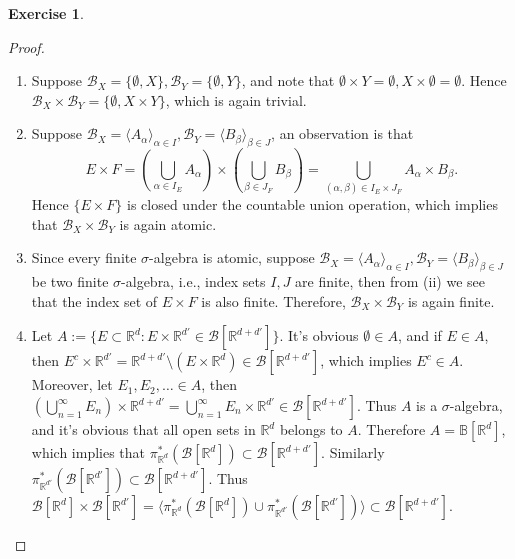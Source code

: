 \documentclass[a4paper]{article}
\newtheorem{ex}{Exercise}[subsection]
\begin{document}
\begin{ex}\end{ex}\begin{proof}\ \begin{enumerate}[label = (\roman*)]
    \item Suppose $\mathcal{B}_X = \{\emptyset, X\}, \mathcal{B}_Y = \{\emptyset, Y\}$, and note that $\emptyset \times Y = \emptyset,
    X \times \emptyset = \emptyset$. Hence $\mathcal{B}_X \times \mathcal{B}_Y = \{\emptyset, X \times Y\}$, which
    is again trivial.
    \item Suppose $\mathcal{B}_X = \langle A_\alpha \rangle_{\alpha \in I}, \mathcal{B}_Y = \langle B_\beta \rangle_{\beta \in J}$, 
    an observation is that $$
    E \times F = (\bigcup_{\alpha \in I_E} A_\alpha) \times (\bigcup_{\beta \in J_F} B_\beta) = \bigcup_{(\alpha, \beta) \in I_E \times J_F}
    A_\alpha \times B_\beta.
    $$Hence $\{E \times F\}$ is closed under the countable union operation, which implies that $\mathcal{B}_X \times \mathcal{B}_Y$
    is again atomic.
    \item Since every finite $\sigma$-algebra is atomic, suppose 
    $\mathcal{B}_X = \langle A_\alpha \rangle_{\alpha \in I}, \mathcal{B}_Y = \langle B_\beta \rangle_{\beta \in J}$ be 
    two finite $\sigma$-algebra, i.e., index sets $I, J$ are finite, then from (ii) we see that the index set of $E \times F$
    is also finite. Therefore, $\mathcal{B}_X \times \mathcal{B}_Y$ is again finite.
    \item Let $A := \{E \subset \mathbb{R}^d : E \times \mathbb{R}^{d'} \in \mathcal{B}[\mathbb{R}^{d + d'}]\}$. 
    It's obvious $\emptyset \in A$, and if $E \in A$, then $E^c \times \mathbb{R}^{d'} = \mathbb{R}^{d + d'} \setminus (E \times \mathbb{R}^d) 
    \in \mathcal{B}[\mathbb{R}^{d + d'}]$, which implies $E^c \in A$. Moreover, let $E_1, E_2, \dots \in A$, then 
    $(\bigcup_{n = 1}^\infty E_n) \times \mathbb{R}^{d + d'} = \bigcup_{n = 1}^\infty E_n \times \mathbb{R}^{d'} \in \mathcal{B}[\mathbb{R}^{d + d'}]$.
    Thus $A$ is a $\sigma$-algebra, and it's obvious that all open sets in $\mathbb{R}^d$ belongs to $A$. Therefore 
    $A = \mathbb{B}[\mathbb{R}^d]$, which implies that $\pi^*_{\mathbb{R}^d}(\mathcal{B}[\mathbb{R}^d]) \subset \mathcal{B}[\mathbb{R}^{d + d'}]$.
    Similarly $\pi^*_{\mathbb{R}^{d'}}(\mathcal{B}[\mathbb{R}^{d'}]) \subset \mathcal{B}[\mathbb{R}^{d + d'}]$. Thus
    $\mathcal{B}[\mathbb{R}^d] \times \mathcal{B}[\mathbb{R}^{d'}] = \langle \pi^*_{\mathbb{R}^d}(\mathcal{B}[\mathbb{R}^d]) \cup 
    \pi^*_{\mathbb{R}^{d'}}(\mathcal{B}[\mathbb{R}^{d'}]) \rangle \subset \mathcal{B}[\mathbb{R}^{d + d'}]$.

\end{enumerate}
\end{proof}
\end{document}
